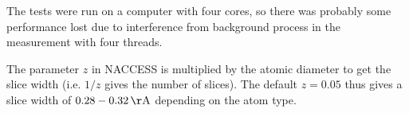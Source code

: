 \documentclass[a4paper,11pt]{article}
\begin{document}
\begin{small}
\begin{thebibliography}{50}
  The tests were run on a computer with four
  cores, so there was probably some performance lost due to
  interference from background process in the measurement with four
  threads.

 The parameter $z$ in NACCESS is multiplied by
  the atomic diameter to get the slice width (i.e. $1/z$ gives the
  number of slices). The default $z=0.05$ thus gives a slice width of
  $0.28 - 0.32\,\mathrm{\AA}$ depending on the atom type.

\end{thebibliography}

\end{small}
\end{document}
